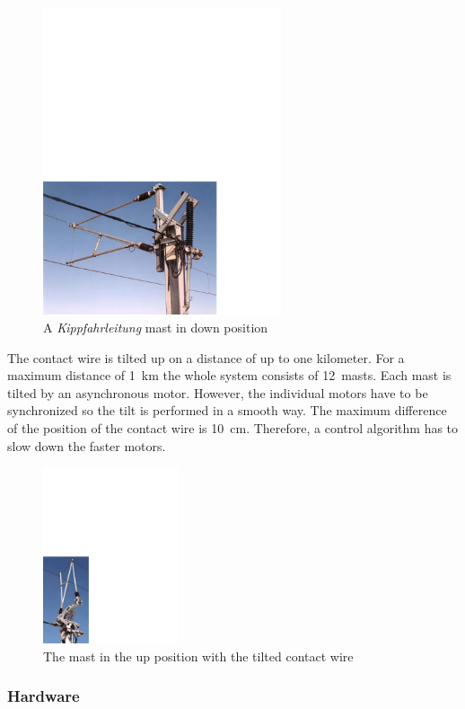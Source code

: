\begin{figure}
    \centering
    \includegraphics[width=7cm]{results/results_kfl_mast1}
    \caption{A \emph{Kippfahrleitung} mast in down position}
    \label{fig:results:kfl:mast}
\end{figure}


The contact wire is tilted up on a distance of up to one kilometer.
For a maximum distance of 1~km the whole system consists of 12~masts.
Each mast is tilted by an asynchronous motor. However, the individual
motors have to be synchronized so the tilt is performed in a smooth
way. The maximum difference of the position of the contact wire is
10~cm. Therefore, a control algorithm has to slow down the faster
motors.

\begin{figure}
    \centering
    \includegraphics[width=4cm]{results/results_kfl_mast2}
    \caption{The mast in the up position with the tilted contact wire}
    \label{fig:results:kfl:mast2}
\end{figure}

\subsubsection{Hardware}

